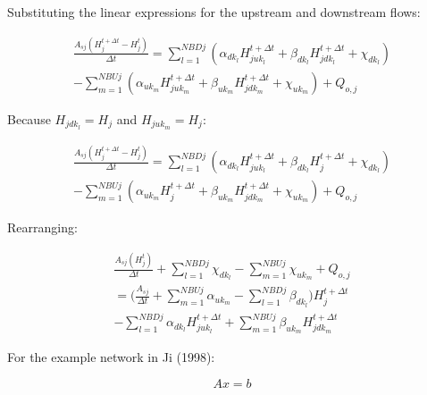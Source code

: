 \documentclass[11pt]{article}
\begin{document}
Substituting the linear expressions for the upstream and downstream flows:

\begin{equation}
  \begin{split}
    \frac{A_{sj} (H_j^{t + \Delta t} - H_j^t)}{\Delta t} =
    \sum_{l=1}^{NBDj} (\alpha_{dk_l} H_{juk_l}^{t + \Delta t} + \beta_{dk_l}
    H_{jdk_l}^{t + \Delta t} + \chi_{dk_l}) \\
    - \sum_{m=1}^{NBUj} (\alpha_{uk_m}
    H_{juk_m}^{t + \Delta t} + \beta_{uk_m} H_{jdk_m}^{t + \Delta t} + \chi_{uk_m}) +
    Q_{o,j}
  \end{split}
\end{equation}

Because $H_{jdk_l} = H_j$ and $H_{juk_m} = H_j$:

\begin{equation}
  \begin{split}
    \frac{A_{sj} (H_j^{t + \Delta t} - H_j^t)}{\Delta t} =
    \sum_{l=1}^{NBDj} (\alpha_{dk_l} H_{juk_l}^{t + \Delta t} + \beta_{dk_l}
    H_{j}^{t + \Delta t} + \chi_{dk_l})\\
    - \sum_{m=1}^{NBUj} (\alpha_{uk_m}
    H_{j}^{t + \Delta t} + \beta_{uk_m} H_{jdk_m}^{t + \Delta t} + \chi_{uk_m}) +
    Q_{o,j}
  \end{split}
\end{equation}

Rearranging:

\begin{equation}
  \begin{split}
    \frac{A_{sj} (H_j^t)}{\Delta t} + \sum_{l=1}^{NBDj} \chi_{dk_l} - \sum_{m=1}^{NBUj} \chi_{uk_m} + Q_{o,j} \\
    =
    \biggl( \frac{A_{sj}}{\Delta t} + \sum_{m=1}^{NBUj} \alpha_{uk_m} - \sum_{l=1}^{NBDj} \beta_{dk_l} \biggr) H_j^{t + \Delta t} \\
    - \sum_{l=1}^{NBDj} \alpha_{dk_l} H_{juk_l}^{t + \Delta t} + \sum_{m=1}^{NBUj} \beta_{uk_m} H_{jdk_m}^{t + \Delta t}
  \end{split}
\end{equation}

For the example network in Ji (1998):

\begin{equation}
  A x = b
\end{equation}
\end{document}

